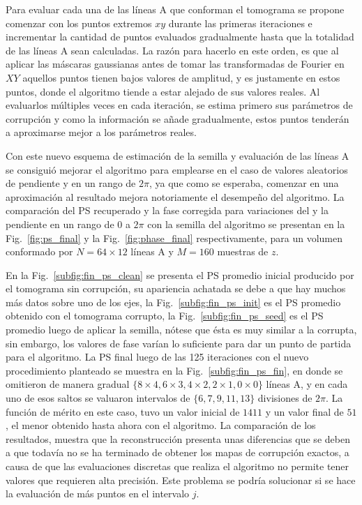 Para evaluar cada una de las líneas A que conforman el tomograma se propone comenzar con los puntos extremos $xy$ durante las primeras iteraciones e incrementar la cantidad de puntos evaluados gradualmente hasta que la totalidad de las líneas A sean calculadas. La razón para hacerlo en este orden, es que al aplicar las máscaras gaussianas antes de tomar las transformadas de Fourier en $XY$ aquellos puntos tienen bajos valores de amplitud, y es justamente en estos puntos, donde el algoritmo tiende a estar alejado de sus valores reales. Al evaluarlos múltiples veces en cada iteración, se estima primero sus parámetros de corrupción y como la información se añade gradualmente, estos puntos tenderán a aproximarse mejor a los parámetros reales.

Con este nuevo esquema de estimación de la semilla y evaluación de las líneas A se consiguió mejorar el algoritmo para emplearse en el caso de valores aleatorios de pendiente y \offset en un rango de $2\pi$, ya que como se esperaba, comenzar en una aproximación al resultado mejora notoriamente el desempeño del algoritmo. La comparación del PS recuperado y la fase corregida para variaciones del \offset y la pendiente en un rango de $0$ a $2\pi$ con la semilla del algoritmo se presentan en la Fig.~\ref{fig:ps_final} y la Fig.~\ref{fig:phase_final} respectivamente, para un volumen conformado por $N=64\times12$ líneas A y $M=160$ muestras de $z$.

En la Fig.~\ref{subfig:fin_ps_clean} se presenta el PS promedio inicial producido por el tomograma sin corrupción, su apariencia achatada se debe a que hay muchos más datos sobre uno de los ejes, la Fig.~\ref{subfig:fin_ps_init} es el PS promedio obtenido con el tomograma corrupto, la Fig.~\ref{subfig:fin_ps_seed} es el PS promedio luego de aplicar la semilla, nótese que ésta es muy similar a la corrupta, sin embargo, los valores de fase varían lo suficiente para dar un punto de partida para el algoritmo. La PS final luego de las 125 iteraciones con el nuevo procedimiento planteado se muestra en la Fig.~\ref{subfig:fin_ps_fin}, en donde se omitieron de manera gradual $\{8\times4, 6\times3, 4\times2, 2\times1, 0\times0\}$ líneas A, y en cada uno de esos saltos se valuaron intervalos de $\{6, 7, 9, 11, 13\}$ divisiones de $2\pi$. La función de mérito en este caso, tuvo un valor inicial de $1411$ y un valor final de $51$, el menor obtenido hasta ahora con el algoritmo. La comparación de los resultados, muestra que la reconstrucción presenta unas diferencias que se deben a que todavía no se ha terminado de obtener los mapas de corrupción exactos, a causa de que las evaluaciones discretas que realiza el algoritmo no permite tener valores que requieren alta precisión. Este problema se podría solucionar si se hace la evaluación de más puntos en el intervalo $j$.

